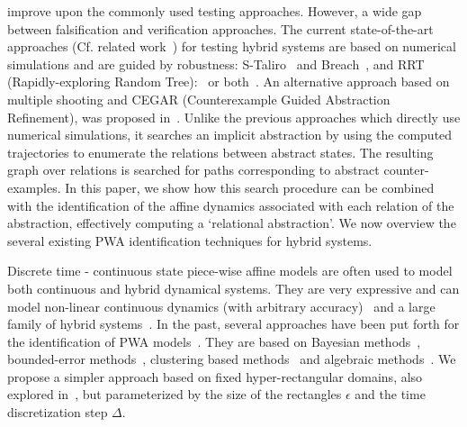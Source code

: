 
improve upon the commonly used testing approaches. However, a wide gap
between falsification and verification approaches. The current
state-of-the-art approaches (Cf. related work~\cite{nghiem2010monte})
for testing hybrid systems are based on numerical simulations and are
guided by robustness: S-Taliro~\cite{annpureddy2011s} and
Breach~\cite{donze2010breach}, and RRT (Rapidly-exploring Random
Tree):~\cite{nahhal_test_2007,Dang09} or
both~\cite{dreossi2015efficient}. An alternative approach based on
multiple shooting and CEGAR (Counterexample Guided Abstraction
Refinement), was proposed in~\cite{zutshi2014multiple}. Unlike the
previous approaches which directly use numerical simulations, it
searches an implicit abstraction by using the computed trajectories to
enumerate the relations between abstract states. The resulting graph
over relations is searched for paths corresponding to abstract
counter-examples. In this paper, we show how this search procedure can
be combined with the identification of the affine dynamics associated
with each relation of the abstraction, effectively computing a
`relational abstraction'. We now overview the several existing PWA
identification techniques for hybrid systems.


 Discrete time - continuous
state piece-wise affine models are often used to model both continuous
and hybrid dynamical systems. They are very expressive and can model
non-linear continuous dynamics (with arbitrary
accuracy)~\cite{wen2008basis} and a large family of hybrid
systems~\cite{heemels2001equivalence}. In the past, several approaches
have been put forth for the identification of PWA
models~\cite{paoletti2007identification}.  They are based on Bayesian
methods~\cite{juloski2005bayesian}, bounded-error
methods~\cite{bemporad2003greedy, bemporad2005bounded,
roll2004identification}, clustering based
methods~\cite{ferrari2003clustering} and algebraic
methods~\cite{vidal2003algebraic}. We propose a simpler approach based
on fixed hyper-rectangular domains, also explored
in~\cite{billings1987piecewise}, but parameterized by the size of the
rectangles $\epsilon$ and the time discretization step $\Delta$.

